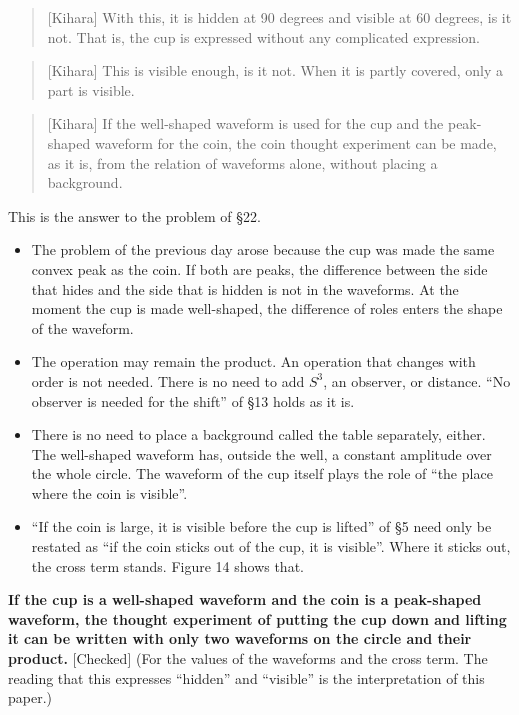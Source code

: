 \documentclass[
  a4paper,
]{article}
\providecommand{\tightlist}{%
  \setlength{\itemsep}{0pt}\setlength{\parskip}{0pt}}
\begin{document}
\begin{quote}
{[}Kihara{]} With this, it is hidden at 90 degrees and visible at 60
degrees, is it not. That is, the cup is expressed without any
complicated expression.
\end{quote}

\begin{quote}
{[}Kihara{]} This is visible enough, is it not. When it is partly
covered, only a part is visible.
\end{quote}

\begin{quote}
{[}Kihara{]} If the well-shaped waveform is used for the cup and the
peak-shaped waveform for the coin, the coin thought experiment can be
made, as it is, from the relation of waveforms alone, without placing a
background.
\end{quote}

This is the answer to the problem of §22.

\begin{itemize}
\tightlist
\item
  The problem of the previous day arose because the cup was made the
  same convex peak as the coin. If both are peaks, the difference
  between the side that hides and the side that is hidden is not in the
  waveforms. At the moment the cup is made well-shaped, the difference
  of roles enters the shape of the waveform.
\item
  The operation may remain the product. An operation that changes with
  order is not needed. There is no need to add \(S^3\), an observer, or
  distance. ``No observer is needed for the shift'' of §13 holds as it
  is.
\item
  There is no need to place a background called the table separately,
  either. The well-shaped waveform has, outside the well, a constant
  amplitude over the whole circle. The waveform of the cup itself plays
  the role of ``the place where the coin is visible''.
\item
  ``If the coin is large, it is visible before the cup is lifted'' of §5
  need only be restated as ``if the coin sticks out of the cup, it is
  visible''. Where it sticks out, the cross term stands. Figure 14 shows
  that.
\end{itemize}

\textbf{If the cup is a well-shaped waveform and the coin is a
peak-shaped waveform, the thought experiment of putting the cup down and
lifting it can be written with only two waveforms on the circle and
their product.} {[}Checked{]} (For the values of the waveforms and the
cross term. The reading that this expresses ``hidden'' and ``visible''
is the interpretation of this paper.)
\end{document}
